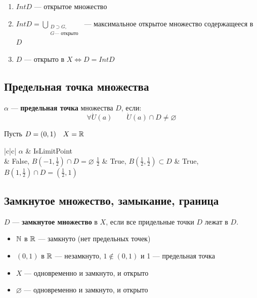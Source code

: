 	\begin{remark} \nobreakspace
	    \begin{enumerate}
	        \item $Int D$ --- открытое множество
	        \item $Int D = \bigcup\limits_{\substack{D \supset G, \\ G \text{--- открыто}}}$ --- 
	        максимальное   открытое множество содержащееся в $D$
	        \item $D$ --- открыто в $X \Leftrightarrow D = Int D$
	    \end{enumerate}
	\end{remark}
	

\subsection{Предельная точка множества}
    \begin{definition}
		$\alpha$ --- \textbf{предельная точка} множества $D$, если:
		$$\forall \dot U(a) \qquad \dot U(a) \cap D \neq \varnothing $$
	\end{definition}
	
	\begin{example}
	Пусть $D = (0,1) \quad X = \operatorname*{\mathbb{R}} $ 
	\\
		\begin{tabular}{|c|c|}
			\hline 
			$\alpha$ & IsLimitPoint \\  & False, $B(-1, \frac{1}{2}) \cap D = \varnothing $ \bnd  \hline 
			$\frac{1}{2}$ & True, $B(\frac{1}{2}, \frac{1}{2}) \subset D  $ \bnd {} & True, $B(1, \frac{1}{2}) \cap D = (\frac{1}{2}, 1)$ \bnd \hline 			
		\end{tabular}
	\end{example}


\subsection{Замкнутое множество, замыкание, граница}
    \begin{definition}
		$D$ --- \textbf{замкнутое множество} в $X$,  если все придельные точки $D$ лежат в $D$.
	\end{definition}
	
	\begin{example}
		\begin{itemize} \nobreakspace
			\item $\operatorname*{\mathbb{N}}$ в $\operatorname*{\mathbb{R}}$ --- замкнуто (нет предельных точек)
			\item $(0, 1) $ в $\operatorname*{\mathbb{R}}$ --- незамкнуто, $1 \not \in (0, 1)$ и 1 --- предельная точка
			\item $X$ --- одновременно и замкнуто, и открыто
			\item $\varnothing $ --- одновременно и замкнуто, и открыто
		\end{itemize}
	\end{example} 
	
